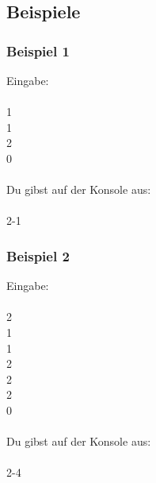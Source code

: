\documentclass{\VorlagenPfad/coderdojokatext}
\begin{document}
	\newpage
	
	\subsection{Beispiele}
	\subsubsection{Beispiel 1}
	Eingabe: \\ \\
	1 \\
	1 \\
	2 \\
	0
	\\ \\
	Du gibst auf der Konsole aus: \\ \\
	2-1
	
	\subsubsection{Beispiel 2}
	Eingabe: \\ \\
	2 \\
	1 \\
	1 \\
	2 \\
	2 \\
	2 \\
	0
	\\ \\
	Du gibst auf der Konsole aus: \\ \\
	2-4
	
\end{document}
